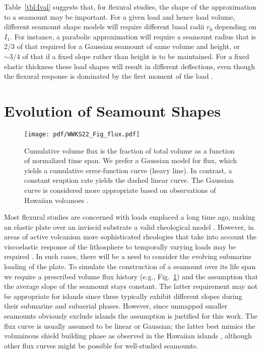 Table~\ref{tbl:Ival} suggests that, for flexural studies, the shape of the approximation to a seamount may be important.
For a given load and hence load volume, different seamount shape models will require different basal radii
$r_0$ depending on $I_1$.  For instance, a parabolic approximation will require a seamount radius that is 2/3
of that required for a Gaussian seamount of same volume and height, or $\sim 3/4$ of that if a fixed slope rather
than height is to be maintained. For a fixed elastic thickness these load shapes will result in different deflections,
even though the flexural response is dominated by the first moment of the load \citep{M1981}.

\section{Evolution of Seamount Shapes}
\label{sec:evol}
\begin{figure}
\centering
\texttt{[image: pdf/WWKS22\_Fig\_flux.pdf]}
\caption{Cumulative volume flux is the fraction of total volume as a function of normalized time span.
We prefer a Gaussian model for flux, which yields a cumulative error-function curve (heavy line). In contrast,
a constant eruption rate yields the dashed linear curve.
The Gaussian curve is considered more appropriate based on observations of Hawaiian volcanoes \citep{DS1996}.}
\label{WWKS22_Fig_flux}
\end{figure}
Most flexural studies are concerned with loads emplaced a long time ago, making an elastic plate over an inviscid substrate
a valid rheological model \citep[e.g.,~][]{WC74}.  However, in areas of active volcanism more sophisticated rheologies that take into
account the viscoelastic response of the lithosphere to temporally varying loads may be required \citep[e.g.,~][]{ZW2013}.
In such cases, there will be a need to consider the evolving submarine loading of the plate. To simulate the construction
of a seamount over its life span we require a prescribed volume flux history (e.g., Fig.~\ref{WWKS22_Fig_flux})
and the assumption that the average slope of the seamount stays constant.  The latter requirement may not be
appropriate for islands since these typically exhibit different slopes during their submarine and subaerial
phases.  However, since unmapped smaller seamounts obviously exclude islands the assumption is justified for this
work. The flux curve is usually assumed to be linear or Gaussian; the latter best mimics the voluminous shield
building phase as observed in the Hawaiian islands \citep{DS1996}, although other flux curves might be possible
for well-studied seamounts.

